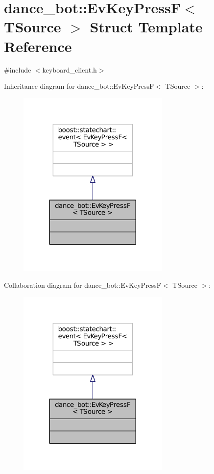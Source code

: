 \hypertarget{structdance__bot_1_1EvKeyPressF}{}\section{dance\+\_\+bot\+:\+:Ev\+Key\+PressF$<$ T\+Source $>$ Struct Template Reference}
\label{structdance__bot_1_1EvKeyPressF}


{\ttfamily \#include $<$keyboard\+\_\+client.\+h$>$}



Inheritance diagram for dance\+\_\+bot\+:\+:Ev\+Key\+PressF$<$ T\+Source $>$\+:
\nopagebreak
\begin{figure}[H]
\begin{center}
\leavevmode
\includegraphics[width=212pt]{structdance__bot_1_1EvKeyPressF__inherit__graph}
\end{center}
\end{figure}


Collaboration diagram for dance\+\_\+bot\+:\+:Ev\+Key\+PressF$<$ T\+Source $>$\+:
\nopagebreak
\begin{figure}[H]
\begin{center}
\leavevmode
\includegraphics[width=212pt]{structdance__bot_1_1EvKeyPressF__coll__graph}
\end{center}
\end{figure}


